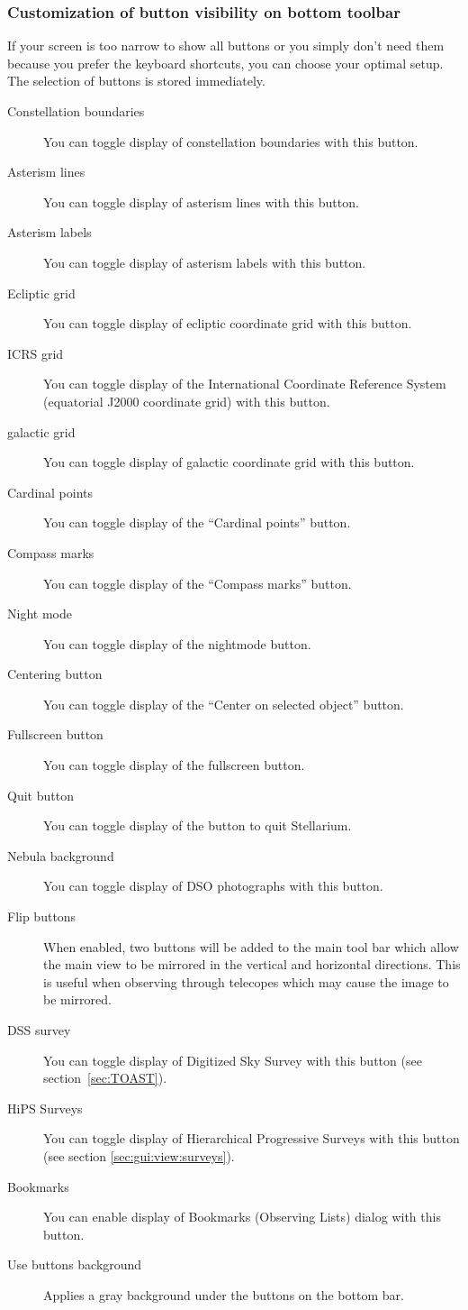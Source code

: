 \subsubsection{Customization of button visibility on bottom toolbar}
If your screen is too narrow to show all buttons
or you simply don't need them because you prefer the keyboard shortcuts,
you can choose your optimal setup. The selection of buttons is stored immediately. 
\begin{description}
\item[Constellation boundaries] You can toggle display of constellation boundaries with this button.
\item[Asterism lines] You can toggle display of asterism lines with this button.
\item[Asterism labels] You can toggle display of asterism labels with this button.
\item[Ecliptic grid] You can toggle display of ecliptic coordinate grid with this button.
\item[ICRS grid] You can toggle display of the International Coordinate Reference System (equatorial J2000 coordinate grid) with this button.
\item[galactic grid] You can toggle display of galactic coordinate grid with this button.
\item[Cardinal points] You can toggle display of the ``Cardinal points'' button.
\item[Compass marks] You can toggle display of the ``Compass marks'' button.
\item[Night mode] You can toggle display of the nightmode button.
\item[Centering button] You can toggle display of the ``Center on selected object'' button.
\item[Fullscreen button] You can toggle display of the fullscreen button.
\item[Quit button] You can toggle display of the button to quit Stellarium.
\item[Nebula background] You can toggle display of DSO photographs with this button.
\item[Flip buttons] When enabled, two buttons will be added to
  the main tool bar which allow the main view to be mirrored in the
  vertical and horizontal directions. This is useful when observing
  through telecopes which may cause the image to be mirrored.
\item[DSS survey] You can toggle display of Digitized Sky Survey with this button (see section~\ref{sec:TOAST}).
\item[HiPS Surveys] You can toggle display of Hierarchical Progressive Surveys with this button (see section \ref{sec:gui:view:surveys}).
\item[Bookmarks] You can enable display of Bookmarks (Observing Lists) dialog with this button.
\item[Use buttons background] Applies a gray background under the buttons on the bottom bar.
\end{description}

